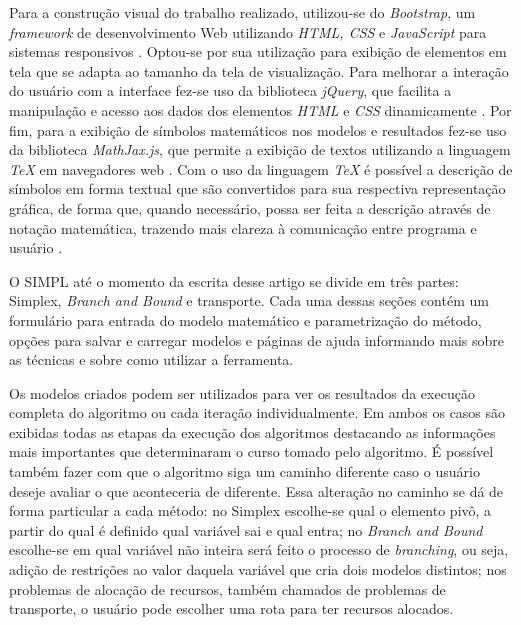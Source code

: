 \documentclass [11pt]{articleSBPO}
\newcommand{\sigla}[0] {SIMPL }
\begin{document}
Para a construção visual do trabalho realizado, utilizou-se do \textit{Bootstrap}, um \textit{framework} de desenvolvimento Web utilizando \textit{HTML, CSS} e \textit{JavaScript} para sistemas responsivos \cite{bootstrap}. Optou-se por sua utilização para exibição de elementos em tela que se adapta ao tamanho da tela de visualização. Para melhorar a interação do usuário com a interface fez-se uso da biblioteca \textit{jQuery}, que facilita a manipulação e acesso aos dados dos elementos \textit{HTML} e \textit{CSS} dinamicamente \cite{jquery}. Por fim, para a exibição de símbolos matemáticos nos modelos e resultados fez-se uso da biblioteca \textit{MathJax.js}, que permite a exibição de textos utilizando a linguagem \textit{TeX} em navegadores web \cite{mathjax}. Com o uso da linguagem \textit{TeX} é possível a descrição de símbolos em forma textual que são convertidos para sua respectiva representação gráfica, de forma que, quando necessário, possa ser feita a descrição através de notação matemática, trazendo mais clareza à comunicação entre programa e usuário \cite{tex}.

O \sigla até o momento da escrita desse artigo se divide em três partes: Simplex, \textit{Branch and Bound} e transporte. Cada uma dessas seções contém um formulário para entrada do modelo matemático e parametrização do método, opções para salvar e carregar modelos e páginas de ajuda informando mais sobre as técnicas e sobre como utilizar a ferramenta.

Os modelos criados podem ser utilizados para ver os resultados da execução completa do algoritmo ou cada iteração individualmente. Em ambos os casos são exibidas todas as etapas da execução dos algoritmos destacando as informações mais importantes que determinaram o curso tomado pelo algoritmo. É possível também fazer com que o algoritmo siga um caminho diferente caso o usuário deseje avaliar o que aconteceria de diferente. Essa alteração no caminho se dá de forma particular a cada método: no Simplex escolhe-se qual o elemento pivô, a partir do qual é definido qual variável sai e qual entra; no \textit{Branch and Bound} escolhe-se em qual variável não inteira será feito o processo de \textit{branching}, ou seja, adição de restrições ao valor daquela variável que cria dois modelos distintos; nos problemas de alocação de recursos, também chamados de problemas de transporte, o usuário pode escolher uma rota para ter recursos alocados.
\end{document}
